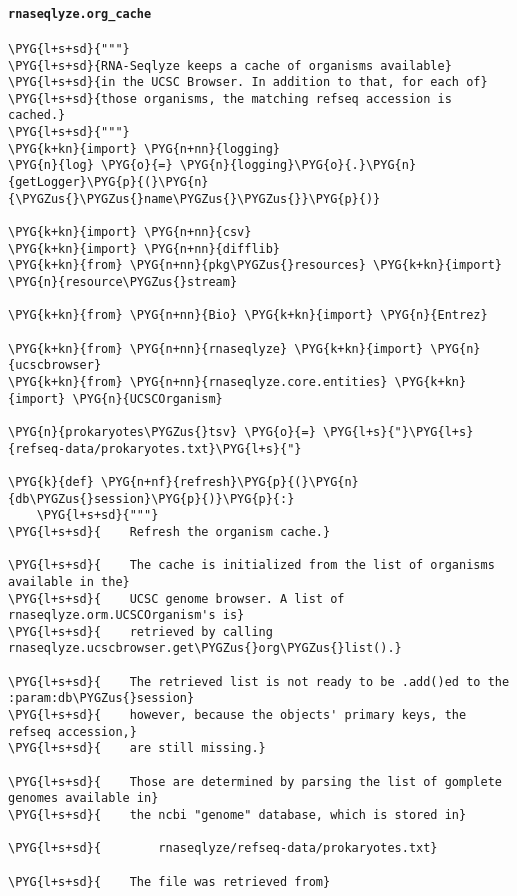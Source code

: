 \paragraph{\texttt{rnaseqlyze.org\_cache}}
\label{index-pdf4:rnaseqlyze-org-cache}
\begin{Verbatim}[commandchars=\\\{\}]
\PYG{l+s+sd}{"""}
\PYG{l+s+sd}{RNA-Seqlyze keeps a cache of organisms available}
\PYG{l+s+sd}{in the UCSC Browser. In addition to that, for each of}
\PYG{l+s+sd}{those organisms, the matching refseq accession is cached.}
\PYG{l+s+sd}{"""}
\PYG{k+kn}{import} \PYG{n+nn}{logging}
\PYG{n}{log} \PYG{o}{=} \PYG{n}{logging}\PYG{o}{.}\PYG{n}{getLogger}\PYG{p}{(}\PYG{n}{\PYGZus{}\PYGZus{}name\PYGZus{}\PYGZus{}}\PYG{p}{)}

\PYG{k+kn}{import} \PYG{n+nn}{csv}
\PYG{k+kn}{import} \PYG{n+nn}{difflib}
\PYG{k+kn}{from} \PYG{n+nn}{pkg\PYGZus{}resources} \PYG{k+kn}{import} \PYG{n}{resource\PYGZus{}stream}

\PYG{k+kn}{from} \PYG{n+nn}{Bio} \PYG{k+kn}{import} \PYG{n}{Entrez}

\PYG{k+kn}{from} \PYG{n+nn}{rnaseqlyze} \PYG{k+kn}{import} \PYG{n}{ucscbrowser}
\PYG{k+kn}{from} \PYG{n+nn}{rnaseqlyze.core.entities} \PYG{k+kn}{import} \PYG{n}{UCSCOrganism}

\PYG{n}{prokaryotes\PYGZus{}tsv} \PYG{o}{=} \PYG{l+s}{"}\PYG{l+s}{refseq-data/prokaryotes.txt}\PYG{l+s}{"}

\PYG{k}{def} \PYG{n+nf}{refresh}\PYG{p}{(}\PYG{n}{db\PYGZus{}session}\PYG{p}{)}\PYG{p}{:}
    \PYG{l+s+sd}{"""}
\PYG{l+s+sd}{    Refresh the organism cache.}

\PYG{l+s+sd}{    The cache is initialized from the list of organisms available in the}
\PYG{l+s+sd}{    UCSC genome browser. A list of rnaseqlyze.orm.UCSCOrganism's is}
\PYG{l+s+sd}{    retrieved by calling rnaseqlyze.ucscbrowser.get\PYGZus{}org\PYGZus{}list().}

\PYG{l+s+sd}{    The retrieved list is not ready to be .add()ed to the :param:db\PYGZus{}session}
\PYG{l+s+sd}{    however, because the objects' primary keys, the refseq accession,}
\PYG{l+s+sd}{    are still missing.}

\PYG{l+s+sd}{    Those are determined by parsing the list of gomplete genomes available in}
\PYG{l+s+sd}{    the ncbi "genome" database, which is stored in}

\PYG{l+s+sd}{        rnaseqlyze/refseq-data/prokaryotes.txt}

\PYG{l+s+sd}{    The file was retrieved from}


\end{Verbatim}
